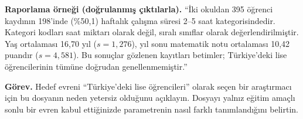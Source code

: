 \textbf{Raporlama örneği (doğrulanmış çıktılarla).}
``İki okuldan 395 öğrenci kaydının 198'inde (\%50,1) haftalık çalışma
süresi 2--5 saat kategorisindedir. Kategori kodları saat miktarı olarak
değil, sıralı sınıflar olarak değerlendirilmiştir. Yaş ortalaması
16,70 yıl ($s=1{,}276$), yıl sonu matematik notu ortalaması 10,42 puandır
($s=4{,}581$). Bu sonuçlar gözlenen kayıtları betimler; Türkiye'deki lise
öğrencilerinin tümüne doğrudan genellenmemiştir.''


\textbf{Görev.} Hedef evreni ``Türkiye'deki lise öğrencileri'' olarak seçen
bir araştırmacı için bu dosyanın neden yetersiz olduğunu açıklayın. Dosyayı
yalnız eğitim amaçlı sonlu bir evren kabul ettiğinizde parametrenin nasıl
farklı tanımlandığını belirtin.